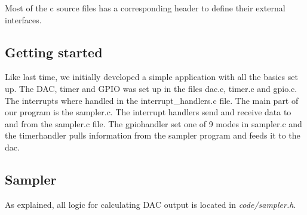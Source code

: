 Most of the c source files has a corresponding header to define their external interfaces.

\subsection{Getting started}
Like last time, we initially developed a simple application with all the basics set up. The DAC, timer and GPIO was set up in the files dac.c, timer.c and gpio.c. The interrupts where handled in the interrupt\_handlers.c file. The main part of our program is the sampler.c. The interrupt handlers send and receive data to and from the sampler.c file. The gpiohandler set one of 9 modes in sampler.c and the timerhandler pulls information from the sampler program and feeds it to the dac. 

\subsection{Sampler}
As explained, all logic for calculating DAC output is located in \emph{code/sampler.h}.
